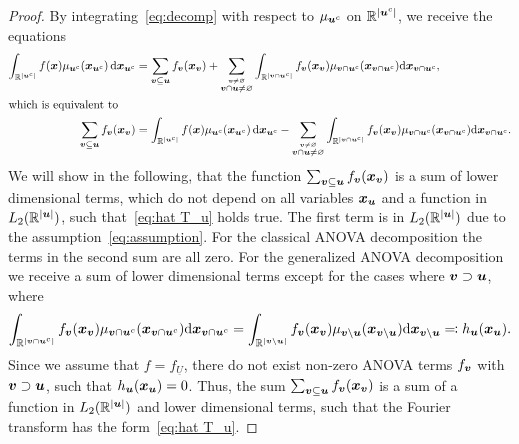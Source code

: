 \documentclass{article}
\renewcommand{\vec}[1]{\ensuremath \mathbf{\boldsymbol{#1}}}
\newcommand{\x}{\ensuremath{\vec x}}
\newcommand{\R}{\ensuremath{\mathbb{R}}}
\newcommand{\dx}{\mathrm{d}}
\renewcommand{\d}{\, \mathrm{d}}
\theoremstyle{definition}
\numberwithin{equation}{section}
\begin{document}
\begin{proof}
By integrating~\eqref{eq:decomp} with respect to $\mu_{\vec u^c}$ on $\R^{|\vec u^c|}$, we receive the equations
\begin{align*}
\int_{\R^{|\vec u^c|}} f(\x) \mu_{\vec u^c}(\x_{\vec u^c})\d\x_{\vec u^c} &= \sum_{\vec v\subseteq \vec u}f_{\vec v}(\x_{\vec v}) + \sum_{\stackrel{\vec v \neq \varnothing }{\vec v\cap\vec u\neq \varnothing}} \int_{\R^{|\vec v\cap \vec u^c|}} f_{\vec v}(\x_\vec v )\mu_{\vec v\cap \vec u^c}(\x_{\vec v\cap \vec u^c})\dx \x_{\vec v\cap \vec u^c},\\
\intertext{which is equivalent to}
 \sum_{\vec v\subseteq \vec u}f_{\vec v}(\x_{\vec v})&= \int_{\R^{|\vec u^c|}} f(\x) \mu_{\vec u^c}(\x_{\vec u^c})\d\x_{\vec u^c} - \sum_{\stackrel{\vec v \neq \varnothing }{\vec v\cap\vec u\neq \varnothing}} \int_{\R^{|\vec v\cap \vec u^c|}} f_{\vec v}(\x_\vec v )\mu_{\vec v\cap \vec u^c}(\x_{\vec v\cap \vec u^c})\dx \x_{\vec v\cap \vec u^c}.
\end{align*}
We will show in the following, that the function $\sum_{\vec v\subseteq \vec u} f_{\vec v}(\x_{\vec v})$ is a sum of lower dimensional terms, which do not depend on all variables $\x_{\vec u}$ and a function in $L_2(\R^{|\vec u|})$, such that~\eqref{eq:hat T_u} holds true. 
The first term is in $L_2(\R^{|\vec u|})$ due to the assumption~\eqref{eq:assumption}.
For the classical ANOVA decomposition the terms in the second sum are all zero. For the generalized ANOVA decomposition we receive a sum of lower dimensional terms except for the cases where $\vec v\supset \vec u$, where
\begin{align*}
\int_{\R^{|\vec v\cap \vec u^c|}} f_{\vec v}(\x_\vec v )\mu_{\vec v\cap \vec u^c}(\x_{\vec v\cap \vec u^c})\dx \x_{\vec v\cap \vec u^c} 
= \int_{\R^{|\vec v\backslash \vec u|}} f_{\vec v}(\x_\vec v )\mu_{\vec v\backslash \vec u}(\x_{\vec v\backslash \vec u})\dx \x_{\vec v\backslash \vec u}\eqqcolon h_{\vec u}(\x_{\vec u}). 
\end{align*}
Since we assume that $f = f_{\underline U}$, there do not exist non-zero ANOVA terms $f_\vec v$ with $\vec v\supset \vec u$, such that 
$h_{\vec u}(\x_{\vec u}) = 0$. Thus, the sum $\sum_{\vec v\subseteq \vec u}f_{\vec v}(\x_{\vec v})$ is a sum of a function in $L_2(\R^{|\vec u|})$ and lower dimensional terms, such that the Fourier transform has the form~\eqref{eq:hat T_u}. %

\end{proof}
\end{document}
